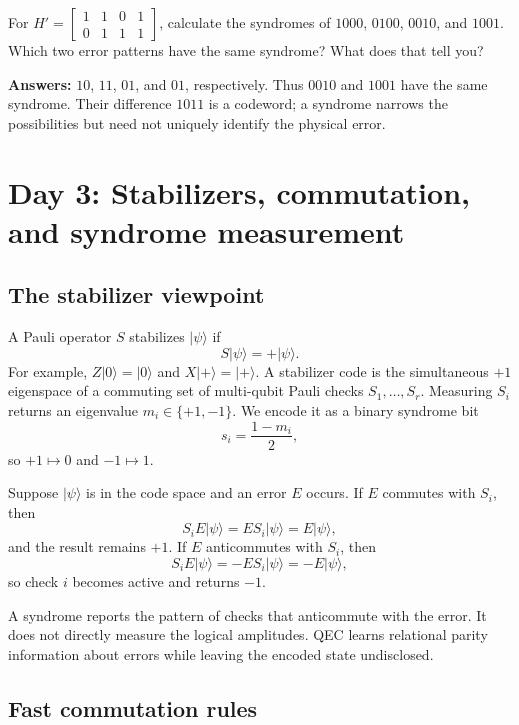 \documentclass[11pt]{article}
\providecommand{\ket}[1]{\lvert #1\rangle}
\begin{document}
\begin{masterybox}[title={Day 2 exercises}]
For
\(
H'=\begin{bmatrix}1&1&0&1\\0&1&1&1\end{bmatrix}
\), calculate the syndromes of \(1000\), \(0100\), \(0010\), and \(1001\). Which two error
patterns have the same syndrome? What does that tell you?

\textbf{Answers:} \(10\), \(11\), \(01\), and \(01\), respectively. Thus \(0010\) and \(1001\)
have the same syndrome. Their difference \(1011\) is a codeword; a syndrome narrows the
possibilities but need not uniquely identify the physical error.
\end{masterybox}

\section{Day 3: Stabilizers, commutation, and syndrome measurement}

\subsection{The stabilizer viewpoint}

A Pauli operator \(S\) stabilizes \(\ket\psi\) if
\[
S\ket\psi=+\ket\psi.
\]
For example, \(Z\ket0=\ket0\) and \(X\ket+=\ket+\). A stabilizer code is the simultaneous
\(+1\) eigenspace of a commuting set of multi-qubit Pauli checks
\(S_1,\ldots,S_r\). Measuring \(S_i\) returns an eigenvalue \(m_i\in\{+1,-1\}\).
We encode it as a binary syndrome bit
\[
s_i=\frac{1-m_i}{2},
\]
so \(+1\mapsto0\) and \(-1\mapsto1\).

Suppose \(\ket\psi\) is in the code space and an error \(E\) occurs. If \(E\) commutes with
\(S_i\), then
\[
S_iE\ket\psi=ES_i\ket\psi=E\ket\psi,
\]
and the result remains \(+1\). If \(E\) anticommutes with \(S_i\), then
\[
S_iE\ket\psi=-ES_i\ket\psi=-E\ket\psi,
\]
so check \(i\) becomes active and returns \(-1\).

\begin{conceptbox}
A syndrome reports the pattern of checks that anticommute with the error. It does not directly
measure the logical amplitudes. QEC learns relational parity information about errors while leaving
the encoded state undisclosed.
\end{conceptbox}

\subsection{Fast commutation rules}
\end{document}
